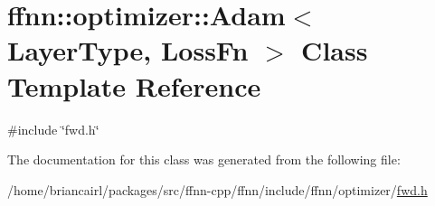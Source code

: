 \hypertarget{classffnn_1_1optimizer_1_1_adam}{\section{ffnn\-:\-:optimizer\-:\-:Adam$<$ Layer\-Type, Loss\-Fn $>$ Class Template Reference}
\label{classffnn_1_1optimizer_1_1_adam}
}


{\ttfamily \#include \char`\"{}fwd.\-h\char`\"{}}



The documentation for this class was generated from the following file\-:\begin{DoxyCompactItemize}
\item 
/home/briancairl/packages/src/ffnn-\/cpp/ffnn/include/ffnn/optimizer/\hyperlink{fwd_8h}{fwd.\-h}\end{DoxyCompactItemize}
